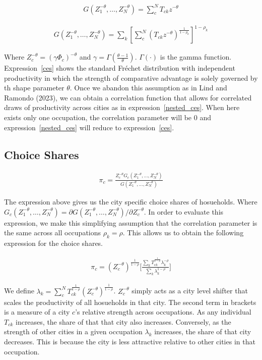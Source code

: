 \documentclass[10pt]{article}
\begin{document}
\begin{align}
    G(Z_1^{- \theta}, \dots, Z_N^{- \theta}) = \sum_{c}^{N} T_{ck} z^{- \theta}
    \label{ces}
\end{align}

\begin{align}
    G(Z_1^{- \theta}, \dots, Z_N^{- \theta}) = \sum_{k}^{} \left[ \sum_{c}^{N} (T_{ck} z^{- \theta})^{\frac{1}{1 - \rho_k}} \right]^{1 - \rho_k}
    \label{nested_ces}
\end{align}

Where $Z_c^{- \theta} = (\gamma \Phi_c)^{- \theta}$ and $\gamma = \Gamma \left( \frac{\theta - 1}{\theta} \right)$. $\Gamma(\cdot)$ is the gamma function. Expression~\ref{ces} shows the standard Fr\'{e}chet distribution with independent productivity in which the strength of comparative advantage is solely governed by th shape parameter $\theta$. Once we abandon this assumption as in Lind and Ramondo (2023), we can obtain a correlation function that allows for correlated draws of productivity across cities as in expression~\ref{nested_ces}. When here exists only one occupation, the correlation parameter will be 0 and expression~\ref{nested_ces} will reduce to expression~\ref{ces}.

\subsection{Choice Shares}

\begin{align}
    \pi_c = \frac{Z_c^{- \theta} G_c(Z_1^{- \theta}, \dots, Z_N^{- \theta})}{G(Z_1^{- \theta}, \dots, Z_N^{- \theta})}
\end{align}

The expression above gives us the city specific choice shares of hosueholds. Where $G_c(Z_1^{- \theta}, \dots, Z_N^{- \theta}) = \partial G(Z_1^{- \theta}, \dots, Z_N^{- \theta}) / \partial Z_c^{- \theta}$. In order to evaluate this expression, we make this simplifying assumption that the correlation parameter is the same across all occupations $\rho_k = \rho$. This allows us to obtain the following expression for the choice shares.

\begin{align}
    \pi_{c} = (Z_{c}^{-\theta})^{\frac{1}{1-\rho}}\Bigg[\frac{\sum\limits_{k}{T^{\frac{1}{1-\rho}}_{ck}}\lambda_{k}^{-\rho}}{\sum\limits_{k}\lambda_{k}^{1-\rho}}\Bigg]
    \label{city_shares}
\end{align}

We define $\lambda_k = \sum\limits_{c}^{N}{T^{\frac{1}{1-\rho}}_{ck}}(Z_{c}^{-\theta})^{\frac{1}{1-\rho}}$. $Z_c^{- \theta}$ simply acts as a city level shifter that scales the productivity of all hosueholds in that city. The second term in brackets is a measure of a city $c$'s relative strength across occupations. As any individual $T_{ck}$ increases, the share of that that city also increases. Conversely, as the strength of other cities in a given occupation $\lambda_k$ increases, the share of that city decreases. This is because the city is less attractive relative to other cities in that occupation.
\end{document}
